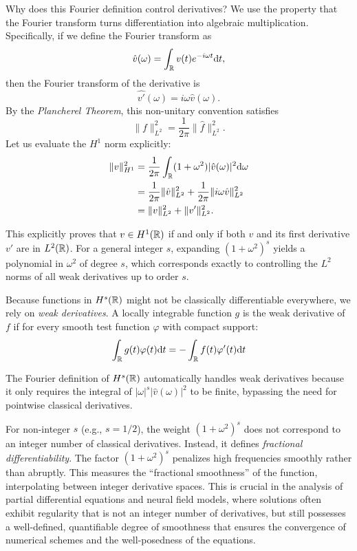 \begin{remark}
Why does this Fourier definition control derivatives? We use the property that the Fourier transform turns differentiation into algebraic multiplication. Specifically, if we define the Fourier transform as \[
\hat{v}(\omega) = \int_{\mathbb{R}} v(t) e^{-i\omega t} \mathrm{d} t,
\] then the Fourier transform of the derivative is
\[
\widehat{v'}(\omega) = i\omega \hat{v}(\omega).
\]
By the \textit{Plancherel Theorem}, this non-unitary convention satisfies
\[
\|f\|_{L^2}^2 = \frac{1}{2\pi}\|\hat{f}\|_{L^2}^2.
\]
Let us evaluate the $H^1$ norm explicitly:
\begin{align}
\|v\|_{H^1}^2 &= \frac{1}{2\pi}\int_{\mathbb{R}} (1 + \omega^2) |\hat{v}(\omega)|^2 \mathrm{d} \omega \notag \\
    &= \frac{1}{2\pi}\|\hat{v}\|_{L^2}^2
    + \frac{1}{2\pi}\|i\omega \hat{v}\|_{L^2}^2 \notag \\
    &= \|v\|_{L^2}^2 + \|v'\|_{L^2}^2.
\end{align}

This explicitly proves that $v \in H^1(\mathbb{R})$ if and only if both $v$ and its first derivative $v'$ are in $L^2(\mathbb{R})$. For a general integer $s$, expanding $(1+\omega^2)^s$ yields a polynomial in $\omega^2$ of degree $s$, which corresponds exactly to controlling the $L^2$ norms of all weak derivatives up to order $s$.
\end{remark}

\begin{definition}
Because functions in $H^s(\mathbb{R})$ might not be classically differentiable everywhere, we rely on \textit{weak derivatives}. A locally integrable function $g$ is the weak derivative of $f$ if for every smooth test function $\varphi$ with compact support:
\begin{equation}
\int_{\mathbb{R}} g(t) \varphi(t) \mathrm{d} t = - \int_{\mathbb{R}} f(t) \varphi'(t) \mathrm{d} t
\end{equation}

The Fourier definition of $H^s(\mathbb{R})$ automatically handles weak derivatives because it only requires the integral of $|\omega|^s |\hat{v}(\omega)|^2$ to be finite, bypassing the need for pointwise classical derivatives.
\end{definition}

\begin{remark}
For non-integer $s$ (e.g., $s = 1/2$), the weight $(1+\omega^2)^s$ does not correspond to an integer number of classical derivatives. Instead, it defines \textit{fractional differentiability}.
The factor $(1+\omega^2)^s$ penalizes high frequencies smoothly rather than abruptly. This measures the ``fractional smoothness'' of the function, interpolating between integer derivative spaces. This is crucial in the analysis of partial differential equations and neural field models, where solutions often exhibit regularity that is not an integer number of derivatives, but still possesses a well-defined, quantifiable degree of smoothness that ensures the convergence of numerical schemes and the well-posedness of the equations.
\end{remark}
